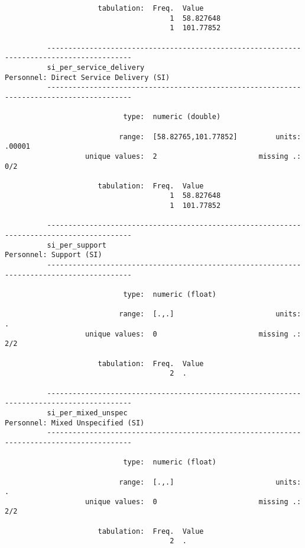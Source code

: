 \documentclass{article}
\begin{document}
\begin{verbatim}
                      tabulation:  Freq.  Value
                                       1  58.827648
                                       1  101.77852
          
          ------------------------------------------------------------------------------------------
          si_per_service_delivery                            Personnel: Direct Service Delivery (SI)
          ------------------------------------------------------------------------------------------
          
                            type:  numeric (double)
          
                           range:  [58.82765,101.77852]         units:  .00001
                   unique values:  2                        missing .:  0/2
          
                      tabulation:  Freq.  Value
                                       1  58.827648
                                       1  101.77852
          
          ------------------------------------------------------------------------------------------
          si_per_support                                                     Personnel: Support (SI)
          ------------------------------------------------------------------------------------------
          
                            type:  numeric (float)
          
                           range:  [.,.]                        units:  .
                   unique values:  0                        missing .:  2/2
          
                      tabulation:  Freq.  Value
                                       2  .
          
          ------------------------------------------------------------------------------------------
          si_per_mixed_unspec                                      Personnel: Mixed Unspecified (SI)
          ------------------------------------------------------------------------------------------
          
                            type:  numeric (float)
          
                           range:  [.,.]                        units:  .
                   unique values:  0                        missing .:  2/2
          
                      tabulation:  Freq.  Value
                                       2  .
          

\end{verbatim}
\end{document}
